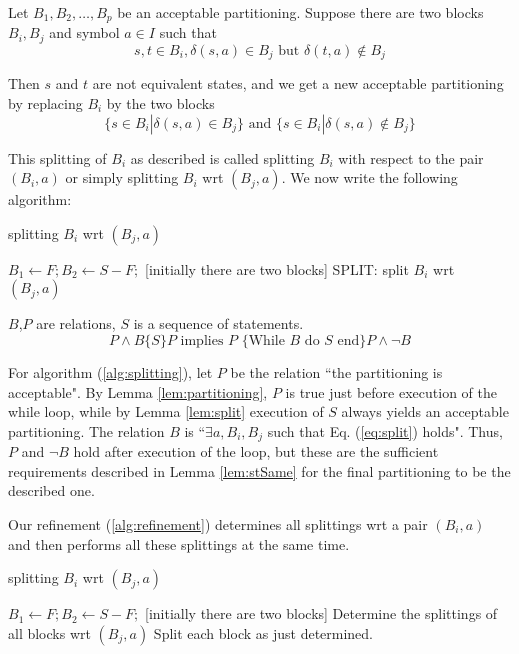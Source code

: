 \begin{lemma} \label{lem:split}
	Let $B_1,B_2,\dots,B_p$ be an acceptable partitioning. Suppose there are two blocks $B_i,B_j$ and symbol $a\in I$ such that
	\begin{equation}
	s,t\in B_i,\delta(s,a)\in B_j \text{ but } \delta(t,a)\notin B_j
	\label{eq:split}
	\end{equation}
	
	Then $s$ and $t$ are not equivalent states, and we get a new acceptable partitioning by replacing $B_i$ by the two blocks
	\begin{equation}
	\{s\in B_i|\delta(s,a)\in B_j\} \text{ and } \{s\in B_i|\delta(s,a)\notin B_j\}
	\end{equation}
\end{lemma}

This splitting of $B_i$ as described is called splitting $B_i$ with respect to the pair $(B_i, a)$ or simply splitting $B_i$ wrt $(B_j, a)$. We now write the following algorithm:

\begin{algorithm}  
	\caption{splitting $B_i$ wrt $(B_j, a)$} 
	\label{alg:splitting} 
	\begin{algorithmic}%
	\State $B_1 \gets F; B_2\gets S-F;$  [initially there are two blocks]  
		\State SPLIT: split $B_i$ wrt $(B_j,a)$
	\EndWhile
	\end{algorithmic}   
\end{algorithm}

$B$,$P$ are relations, $S$ is a sequence of statements.
\begin{equation}
	P\land B\{S\}P \text{ implies $P$ \{While $B$ do $S$ end\} } P\land\lnot B
\end{equation}

For algorithm (\ref{alg:splitting}), let $P$ be the relation ``the partitioning is acceptable". By Lemma \ref{lem:partitioning}, $P$ is true just before execution of the while loop, while by Lemma \ref{lem:split} execution of $S$ always yields an acceptable partitioning. The relation $B$ is ``$\exists a,B_i,B_j$ such that  Eq. (\ref{eq:split}) holds". Thus, $P$ and $\lnot B$ hold after execution of the loop, but these are the sufficient requirements described in Lemma \ref{lem:stSame} for the final partitioning to be the described one.

Our refinement (\ref{alg:refinement}) determines all splittings wrt a pair $(B_i, a)$ and then performs all these splittings at the same time.
\begin{algorithm}  
	\caption{splitting $B_i$ wrt $(B_j, a)$} 
	\label{alg:refinement} 
	\begin{algorithmic}%
		\State $B_1 \gets F; B_2\gets S-F;$  [initially there are two blocks]  
		\State Determine the splittings of all blocks wrt $(B_j,a)$
		\State Split each block as just determined.
		\EndWhile
	\end{algorithmic}   
\end{algorithm}

